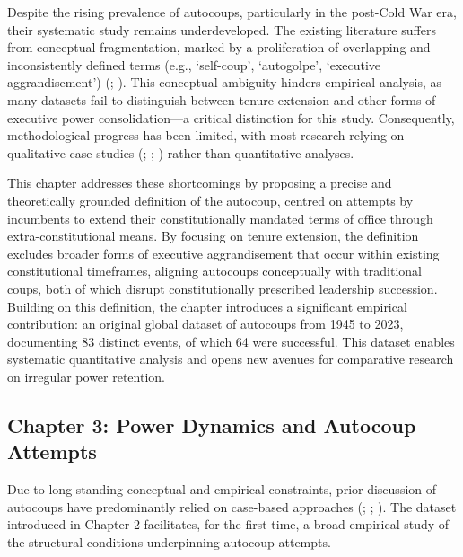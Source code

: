 \documentclass[
  12pt,
]{report}
\begin{document}
Despite the rising prevalence of autocoups, particularly in the
post-Cold War era, their systematic study remains underdeveloped. The
existing literature suffers from conceptual fragmentation, marked by a
proliferation of overlapping and inconsistently defined terms (e.g.,
`self-coup', `autogolpe', `executive aggrandisement')
(;
). This conceptual
ambiguity hinders empirical analysis, as many datasets fail to
distinguish between tenure extension and other forms of executive power
consolidation---a critical distinction for this study. Consequently,
methodological progress has been limited, with most research relying on
qualitative case studies (; ;
)
rather than quantitative analyses.

This chapter addresses these shortcomings by proposing a precise and
theoretically grounded definition of the autocoup, centred on attempts
by incumbents to extend their constitutionally mandated terms of office
through extra-constitutional means. By focusing on tenure extension, the
definition excludes broader forms of executive aggrandisement that occur
within existing constitutional timeframes, aligning autocoups
conceptually with traditional coups, both of which disrupt
constitutionally prescribed leadership succession. Building on this
definition, the chapter introduces a significant empirical contribution:
an original global dataset of autocoups from 1945 to 2023, documenting
83 distinct events, of which 64 were successful. This dataset enables
systematic quantitative analysis and opens new avenues for comparative
research on irregular power retention.

\subsection*{Chapter 3: Power Dynamics and Autocoup
Attempts}\label{chapter-3-power-dynamics-and-autocoup-attempts}

Due to long-standing conceptual and empirical constraints, prior
discussion of autocoups have predominantly relied on case-based
approaches (;
;
). The dataset
introduced in Chapter 2 facilitates, for the first time, a broad
empirical study of the structural conditions underpinning autocoup
attempts.
\end{document}
